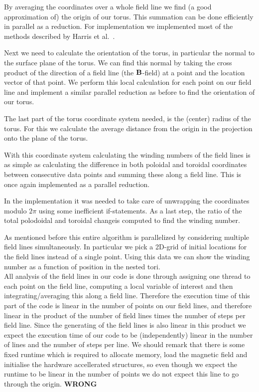 \documentclass{article}
\renewcommand{\vec}{\bold}
\begin{document}
By averaging the coordinates over a whole field line we find (a good approximation of) the origin of our torus. This summation can be done efficiently in parallel as a reduction. For implementation we implemented most of the methods described by Harris et al.~\cite{harris2007optimizing}.

Next we need to calculate the orientation of the torus, in particular the normal to the surface plane of the torus. We can find this normal by taking the cross product of the direction of a field line (the $\vec{B}$-field) at a point and the location vector of that point. We perform this local calculation for each point on our field line and implement a similar parallel reduction as before to find the orientation of our torus.

The last part of the torus coordinate system needed, is the (center) radius of the torus. For this we calculate the average distance from the origin in the projection onto the plane of the torus. %

With this coordinate system calculating the winding numbers of the field lines is as simple as calculating the difference in both poloidal and toroidal coordinates between consecutive data points and summing these along a field line. This is once again implemented as a parallel reduction.

In the implementation it was needed to take care of unwrapping the coordinates modulo $2\pi$ using some inefficient if-statements. %
As a last step, the ratio of the total polodoidal and toroidal changeis computed to find the winding number.

As mentioned before this entire algorithm is parallelized by considering multiple field lines simultaneously. In particular we pick a 2D-grid of initial locations for the field lines instead of a single point. Using this data we can show the winding number as a function of position in the nested tori.\\

All analysis of the field lines in our code is done through assigning one thread to each point on the field line, computing a local variable of interest and then integrating/averaging this along a field line. Therefore the execution time of this part of the code is linear in the number of points on our field lines, and therefore linear in the product of the number of field lines times the number of steps per field line. Since the generating of the field lines is also linear in this product we expect the execution time of our code to be (independently) linear in the number of lines and the number of steps per line. We should remark that there is some fixed runtime which is required to allocate memory, load the magnetic field and initialise the hardware accellerated structures, so even though we expect the runtime to be linear in the number of points we do not expect this line to go through the origin.
 \textbf{WRONG}
\end{document}
